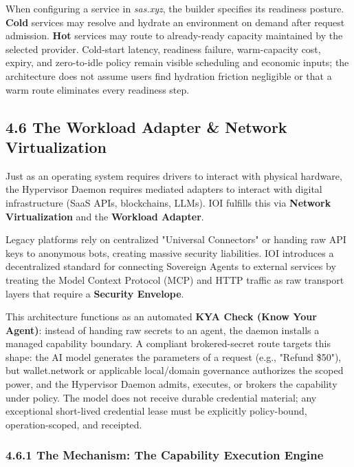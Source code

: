 \documentclass[
  11pt,
]{article}
\begin{document}
When configuring a service in \emph{sas.xyz}, the builder specifies its
readiness posture. \textbf{Cold} services may resolve and hydrate an
environment on demand after request admission. \textbf{Hot} services may route
to already-ready capacity maintained by the selected provider. Cold-start
latency, readiness failure, warm-capacity cost, expiry, and zero-to-idle policy
remain visible scheduling and economic inputs; the architecture does not assume
users find hydration friction negligible or that a warm route eliminates every
readiness step.

\hypertarget{the-workload-adapter-network-virtualization}{%
\subsection{4.6 The Workload Adapter \& Network
Virtualization}\label{the-workload-adapter-network-virtualization}}

Just as an operating system requires drivers to interact with physical
hardware, the Hypervisor Daemon requires mediated adapters to interact
with digital infrastructure (SaaS APIs, blockchains, LLMs). IOI fulfills
this via \textbf{Network Virtualization} and the \textbf{Workload Adapter}.

Legacy platforms rely on centralized "Universal Connectors" or handing
raw API keys to anonymous bots, creating massive security liabilities.
IOI introduces a decentralized standard for connecting Sovereign Agents
to external services by treating the Model Context Protocol (MCP) and
HTTP traffic as raw transport layers that require a \textbf{Security
Envelope}.

This architecture functions as an automated \textbf{KYA Check (Know Your
Agent)}: instead of handing raw secrets to an agent, the daemon installs
a managed capability boundary. A compliant brokered-secret route targets this
shape:
the AI model generates the parameters of a request (e.g., "Refund
\$50"), but wallet.network or applicable local/domain governance
authorizes the scoped power, and the Hypervisor Daemon admits, executes,
or brokers the capability under policy. The model
does not receive durable credential material; any exceptional
short-lived credential lease must be explicitly policy-bound,
operation-scoped, and receipted.

\hypertarget{the-mechanism-the-capability-execution-engine}{%
\subsubsection{4.6.1 The Mechanism: The Capability Execution
Engine}\label{the-mechanism-the-capability-execution-engine}}
\end{document}
